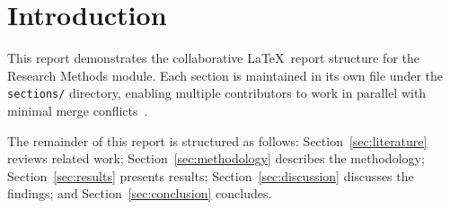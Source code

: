 \section{Introduction}
\label{sec:introduction}

This report demonstrates the collaborative \LaTeX\ report structure for the Research Methods module.
Each section is maintained in its own file under the \texttt{sections/} directory, enabling
multiple contributors to work in parallel with minimal merge conflicts~\cite{doe2023}.

The remainder of this report is structured as follows: Section~\ref{sec:literature} reviews
related work; Section~\ref{sec:methodology} describes the methodology; Section~\ref{sec:results}
presents results; Section~\ref{sec:discussion} discusses the findings; and
Section~\ref{sec:conclusion} concludes.
